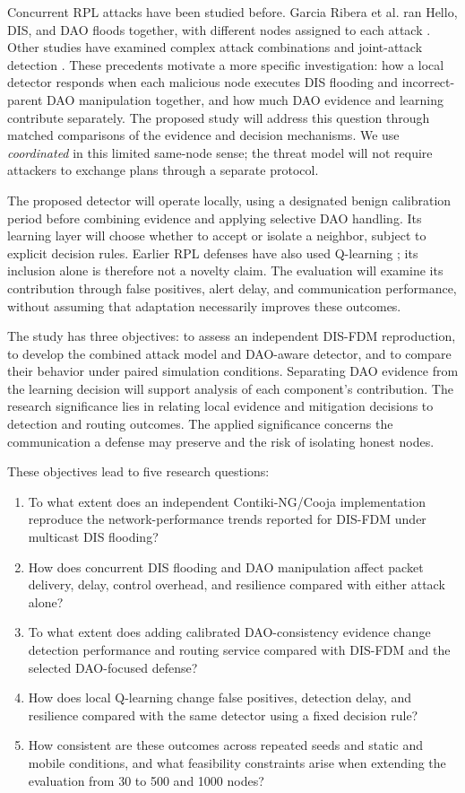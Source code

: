 \documentclass[journal]{IEEEtran}
\begin{document}
Concurrent RPL attacks have been studied before. Garcia Ribera et al. ran Hello, DIS, and DAO floods together, with different nodes assigned to each attack \cite{garciaribera2022}. Other studies have examined complex attack combinations and joint-attack detection \cite{alsukayti2023,de2rarpl2024,abdulkareem2024}. These precedents motivate a more specific investigation: how a local detector responds when each malicious node executes DIS flooding and incorrect-parent DAO manipulation together, and how much DAO evidence and learning contribute separately. The proposed study will address this question through matched comparisons of the evidence and decision mechanisms. We use \emph{coordinated} in this limited same-node sense; the threat model will not require attackers to exchange plans through a separate protocol.

The proposed detector will operate locally, using a designated benign calibration period before combining evidence and applying selective DAO handling. Its learning layer will choose whether to accept or isolate a neighbor, subject to explicit decision rules. Earlier RPL defenses have also used Q-learning \cite{qsecrpl2023,itrpl2024}; its inclusion alone is therefore not a novelty claim. The evaluation will examine its contribution through false positives, alert delay, and communication performance, without assuming that adaptation necessarily improves these outcomes.

The study has three objectives: to assess an independent DIS-FDM reproduction, to develop the combined attack model and DAO-aware detector, and to compare their behavior under paired simulation conditions. Separating DAO evidence from the learning decision will support analysis of each component's contribution. The research significance lies in relating local evidence and mitigation decisions to detection and routing outcomes. The applied significance concerns the communication a defense may preserve and the risk of isolating honest nodes.

These objectives lead to five research questions:
\begin{enumerate}
\item[\emph{RQ1:}] To what extent does an independent Contiki-NG/Cooja implementation reproduce the network-performance trends reported for DIS-FDM under multicast DIS flooding?
\item[\emph{RQ2:}] How does concurrent DIS flooding and DAO manipulation affect packet delivery, delay, control overhead, and resilience compared with either attack alone?
\item[\emph{RQ3:}] To what extent does adding calibrated DAO-consistency evidence change detection performance and routing service compared with DIS-FDM and the selected DAO-focused defense?
\item[\emph{RQ4:}] How does local Q-learning change false positives, detection delay, and resilience compared with the same detector using a fixed decision rule?
\item[\emph{RQ5:}] How consistent are these outcomes across repeated seeds and static and mobile conditions, and what feasibility constraints arise when extending the evaluation from 30 to 500 and 1000 nodes?
\end{enumerate}
\end{document}
